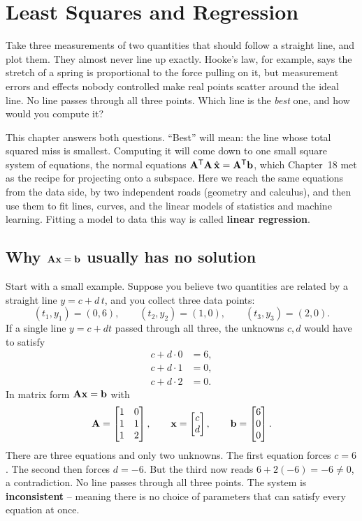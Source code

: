 \chapter{Least Squares and Regression}

Take three measurements of two quantities that should follow a straight line, and plot them. They
almost never line up exactly. Hooke's law, for example, says the stretch of a spring is proportional
to the force pulling on it, but measurement errors and effects nobody controlled make real points
scatter around the ideal line. No line passes through all three points. Which line is the
\emph{best} one, and how would you compute it?

This chapter answers both questions. ``Best'' will mean: the line whose total squared miss is
smallest. Computing it will come down to one small square system of equations, the normal equations
$\mathbf{A}^{\mathsf{T}}\mathbf{A}\,\hat{\mathbf{x}}=\mathbf{A}^{\mathsf{T}}\mathbf{b}$, which Chapter~18 met as the recipe for
projecting onto a subspace. Here we reach the same equations from the data side, by two
independent roads (geometry and calculus), and then use them to fit lines, curves, and the linear
models of statistics and machine learning. Fitting a model to data this way is called
\textbf{linear regression}.

\section{Why \texorpdfstring{$\mathbf{A}\mathbf{x}=\mathbf{b}$}{Ax=b} usually has no solution}

Start with a small example. Suppose you believe two quantities are related by a
straight line $y = c + d\,t$, and you collect three data points:
\[
  (t_1,y_1)=(0,6),\qquad (t_2,y_2)=(1,0),\qquad (t_3,y_3)=(2,0).
\]
If a single line $y=c+dt$ passed through all three, the unknowns $c,d$ would have to satisfy
\[
  \begin{aligned}
    c + d\cdot 0 &= 6,\\
    c + d\cdot 1 &= 0,\\
    c + d\cdot 2 &= 0.
  \end{aligned}
\]
In matrix form $\mathbf{A}\mathbf{x}=\mathbf{b}$ with
\[
  \mathbf{A}=\begin{bmatrix} 1 & 0\\ 1 & 1\\ 1 & 2\end{bmatrix},
  \qquad
  \mathbf{x}=\begin{bmatrix}c\\d\end{bmatrix},
  \qquad
  \mathbf{b}=\begin{bmatrix}6\\0\\0\end{bmatrix}.
\]
There are three equations and only two unknowns. The first equation forces $c=6$. The second
then forces $d=-6$. But the third now reads $6 + 2(-6) = -6 \ne 0$, a contradiction. No line
passes through all three points. The system is \textbf{inconsistent} -- meaning there is no choice of parameters that can
satisfy every equation at once.

